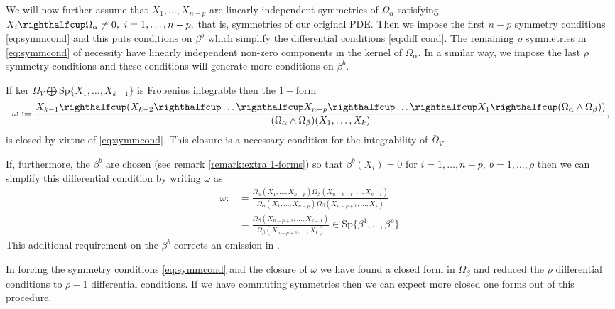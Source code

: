 \documentclass[a4paper, 11pt]{amsart}
\theoremstyle{definition}
\begin{document}
We will now further assume that $X_1,\ldots,X_{n-p}$ are linearly independent symmetries of $\Omega_\alpha$ satisfying $X_i\righthalfcup \Omega_\alpha\neq 0,~i=1,\ldots,n-p,$ that is, symmetries of our original PDE. Then we impose the first $n-p$ symmetry conditions \eqref{eq:symmcond} and this puts conditions on $\beta^b$ which simplify the differential conditions \eqref{eq:diff cond}. The remaining $\rho$ symmetries in \eqref{eq:symmcond} of necessity have linearly independent non-zero components in the kernel of $\Omega_\alpha.$  In a similar way, we impose the last $\rho$ symmetry conditions and these conditions will generate more conditions on $\beta^b.$

 If ker $\bar{\Omega}_V\bigoplus {\text{Sp}}\{X_1,\ldots,X_{k-1}\}$ is Frobenius integrable then the $1-$form
\[\omega:=\frac{X_{k-1}\righthalfcup (X_{k-2}\righthalfcup\ldots\righthalfcup X_{n-p}\righthalfcup\ldots \righthalfcup X_1 \righthalfcup(\Omega_\alpha\wedge\Omega_\beta))}{(\Omega_\alpha\wedge\Omega_\beta)(X_1,\dots,X_k)},\]
is closed by virtue of \eqref{eq:symmcond}. This closure is a necessary condition for the integrability of $\bar\Omega_V.$

If, furthermore, the $\beta^b$ are chosen (see remark \ref{remark:extra 1-forms}) so that $\beta^b(X_i)=0$ for $i=1,\ldots,n-p,~b=1,\ldots,\rho$  then we can simplify this differential condition by writing $\omega$ as
\begin{align*}
 \omega:&=\frac{\Omega_\alpha(X_1,\ldots,X_{n-p})\Omega_\beta(X_{n-p+1},\ldots,X_{k-1})}{\Omega_\alpha(X_1,\ldots,X_{n-p})\Omega_\beta(X_{n-p+1},\dots,X_k)}\\
 &=\frac{\Omega_\beta(X_{n-p+1},\ldots,X_{k-1})}{\Omega_\beta(X_{n-p+1},\dots,X_k)}\in{\text{Sp}}\{\beta^1,\ldots,\beta^\rho\}.
\end{align*}
This additional requirement on the $\beta^b$ corrects an omission in \cite[\S 5]{NTGP13}.

In forcing the symmetry conditions \eqref{eq:symmcond} and the closure of $\omega$ we have found a closed form in $\Omega_\beta$ and reduced the $\rho$ differential conditions to $\rho-1$ differential conditions. If we have commuting symmetries then we can expect more closed one forms out of this procedure.
\end{document}

